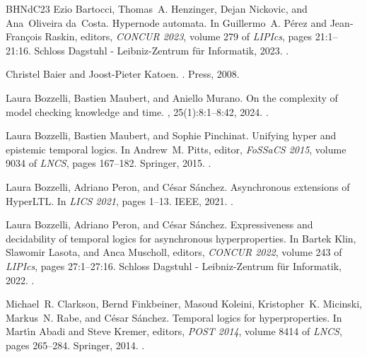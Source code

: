 \documentclass[dvipsnames,10pt,a4paper]{amsart}
\theoremstyle{definition}
\theoremstyle{remark}
\begin{document}
\begin{thebibliography}{BHNdC23}
Ezio Bartocci, Thomas~A. Henzinger, Dejan Nickovic, and Ana~Oliveira da~Costa.
\newblock Hypernode automata.
\newblock In Guillermo~A. P{\'{e}}rez and Jean{-}Fran{\c{c}}ois Raskin,
  editors, {\em CONCUR 2023}, volume 279 of {\em LIPIcs}, pages 21:1--21:16.
  Schloss Dagstuhl - Leibniz-Zentrum für Informatik, 2023.
\newblock \href {https://doi.org/10.4230/LIPICS.CONCUR.2023.21}
  {}.

Christel Baier and Joost{-}Pieter Katoen.
.
 Press, 2008.

Laura Bozzelli, Bastien Maubert, and Aniello Murano.
\newblock On the complexity of model checking knowledge and time.
, 25(1):8:1--8:42, 2024.
\newblock \href {https://doi.org/10.1145/3637212} {}.

Laura Bozzelli, Bastien Maubert, and Sophie Pinchinat.
\newblock Unifying hyper and epistemic temporal logics.
\newblock In Andrew~M. Pitts, editor, {\em FoSSaCS 2015}, volume 9034 of {\em
  LNCS}, pages 167--182. Springer, 2015.
\newblock \href {https://doi.org/10.1007/978-3-662-46678-0\_11}
  {}.

Laura Bozzelli, Adriano Peron, and C{\'{e}}sar S{\'{a}}nchez.
\newblock Asynchronous extensions of {HyperLTL}.
\newblock In {\em {LICS} 2021}, pages 1--13. {IEEE}, 2021.
\newblock \href {https://doi.org/10.1109/LICS52264.2021.9470583}
  {}.

Laura Bozzelli, Adriano Peron, and C{\'{e}}sar S{\'{a}}nchez.
\newblock Expressiveness and decidability of temporal logics for asynchronous
  hyperproperties.
\newblock In Bartek Klin, Slawomir Lasota, and Anca Muscholl, editors, {\em
  {CONCUR} 2022}, volume 243 of {\em LIPIcs}, pages 27:1--27:16. Schloss
  Dagstuhl - Leibniz-Zentrum für Informatik, 2022.
\newblock \href {https://doi.org/10.4230/LIPIcs.CONCUR.2022.27}
  {}.

Michael~R. Clarkson, Bernd Finkbeiner, Masoud Koleini, Kristopher~K. Micinski,
  Markus~N. Rabe, and C{\'{e}}sar S{\'{a}}nchez.
\newblock Temporal logics for hyperproperties.
\newblock In Mart{\'{\i}}n Abadi and Steve Kremer, editors, {\em {POST} 2014},
  volume 8414 of {\em LNCS}, pages 265--284. Springer, 2014.
\newblock \href {https://doi.org/10.1007/978-3-642-54792-8\_15}
  {}.


\end{thebibliography}
\end{document}
